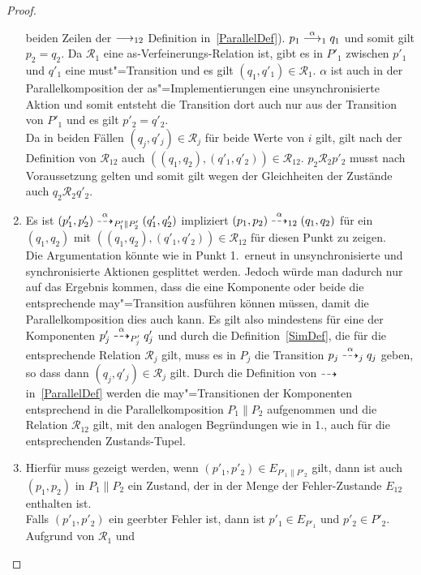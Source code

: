 \begin{proof}
\begin{enumerate}
      beiden Zeilen der $\must _{12}$ Definition in~\ref{ParallelDef}). \OBdA{}
      $p_1\must[\alpha]_1q_1$ und somit gilt $p_2=q_2$. Da $\mathcal{R}_1$ eine
      as-Verfeinerungs-Relation ist, gibt es in $P'_1$ zwischen $p'_1$ und
      $q'_1$ eine must"=Transition und es gilt $(q_1,q'_1)\in\mathcal{R}_1$.
      $\alpha$ ist auch in der Parallelkomposition der as"=Implementierungen
      eine unsynchronisierte Aktion und somit entsteht die Transition dort auch
      nur aus der Transition von $P'_1$ und es gilt $p'_2=q'_2$.\\
      Da in beiden Fällen $(q_j,q'_j)\in \mathcal{R}_j$ für beide Werte von $i$
      gilt, gilt nach der Definition von $\mathcal{R}_{12}$ auch
      $((q_1,q_2),(q'_1,q'_2))\in \mathcal{R}_{12}$.
      $p_2\mathcal{R}_2p'_2$ musst nach Voraussetzung gelten und somit gilt
      wegen der Gleichheiten der Zustände auch $q_2\mathcal{R}_2q'_2$.
    \item Es ist $(p'_1,p'_2)\may[\alpha]_{P'_1\|P'_2}(q'_1,q'_2)$ impliziert
      $(p_1,p_2)\may[\alpha]_{12}(q_1,q_2)$ für ein $(q_1,q_2)$ mit
      $((q_1,q_2),(q'_1,q'_2))\in\mathcal{R}_{12}$ für diesen Punkt zu
      zeigen.\\
      Die Argumentation könnte wie in Punkt 1.\ erneut in unsynchronisierte und
      synchronisierte Aktionen gesplittet werden. Jedoch würde man dadurch nur
      auf das Ergebnis kommen, dass die eine Komponente oder beide die
      entsprechende may"=Transition ausführen können müssen, damit die
      Parallelkomposition dies auch kann. Es gilt also mindestens für eine der
      Komponenten $p'_j\may[\alpha]_{P'_j}q'_j$ und durch die
      Definition~\ref{SimDef}, die für die entsprechende Relation
      $\mathcal{R}_j$ gilt, muss es in $P_j$ die Transition
      $p_j\may[\alpha]_jq_j$ geben, so dass dann $(q_j,q'_j)\in\mathcal{R}_j$
      gilt. Durch die Definition von $\may$ in~\ref{ParallelDef} werden die
      may"=Transitionen der Komponenten entsprechend in die Parallelkomposition
      $P_1\|P_2$ aufgenommen und die Relation $\mathcal{R}_{12}$ gilt, mit den
      analogen Begründungen wie in 1., auch für die entsprechenden
      Zustands-Tupel.
    \item Hierfür muss gezeigt werden, wenn $(p'_1,p'_2)\in E_{P'_1\|P'_2}$
      gilt, dann ist auch $(p_1,p_2)$ in $P_1\|P_2$ ein Zustand, der in der
      Menge der Fehler-Zustande $E_{12}$ enthalten ist.\\
      Falls $(p'_1,p'_2)$ ein geerbter Fehler ist, dann ist \oBdA{} $p'_1\in
      E_{P'_1}$ und $p'_2\in P'_2$. Aufgrund von $\mathcal{R}_1$ und

\end{enumerate}
\end{proof}
